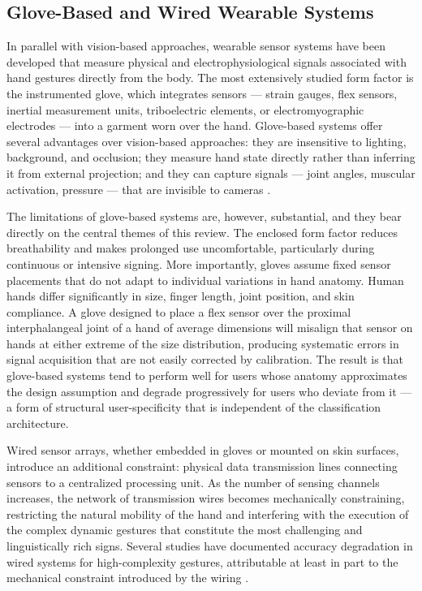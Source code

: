 \documentclass[11pt, a4paper]{article}
\theoremstyle{definition}
\begin{document}
\subsection{Glove-Based and Wired Wearable Systems}

In parallel with vision-based approaches, wearable sensor systems have been developed that measure physical and electrophysiological signals associated with hand gestures directly from the body. The most extensively studied form factor is the instrumented glove, which integrates sensors --- strain gauges, flex sensors, inertial measurement units, triboelectric elements, or electromyographic electrodes --- into a garment worn over the hand. Glove-based systems offer several advantages over vision-based approaches: they are insensitive to lighting, background, and occlusion; they measure hand state directly rather than inferring it from external projection; and they can capture signals --- joint angles, muscular activation, pressure --- that are invisible to cameras \cite{lee2017,kakoty2018,wu2016}.

The limitations of glove-based systems are, however, substantial, and they bear directly on the central themes of this review. The enclosed form factor reduces breathability and makes prolonged use uncomfortable, particularly during continuous or intensive signing. More importantly, gloves assume fixed sensor placements that do not adapt to individual variations in hand anatomy. Human hands differ significantly in size, finger length, joint position, and skin compliance. A glove designed to place a flex sensor over the proximal interphalangeal joint of a hand of average dimensions will misalign that sensor on hands at either extreme of the size distribution, producing systematic errors in signal acquisition that are not easily corrected by calibration. The result is that glove-based systems tend to perform well for users whose anatomy approximates the design assumption and degrade progressively for users who deviate from it --- a form of structural user-specificity that is independent of the classification architecture.

Wired sensor arrays, whether embedded in gloves or mounted on skin surfaces, introduce an additional constraint: physical data transmission lines connecting sensors to a centralized processing unit. As the number of sensing channels increases, the network of transmission wires becomes mechanically constraining, restricting the natural mobility of the hand and interfering with the execution of the complex dynamic gestures that constitute the most challenging and linguistically rich signs. Several studies have documented accuracy degradation in wired systems for high-complexity gestures, attributable at least in part to the mechanical constraint introduced by the wiring \cite{wu2016,zhang2022}.
\end{document}
